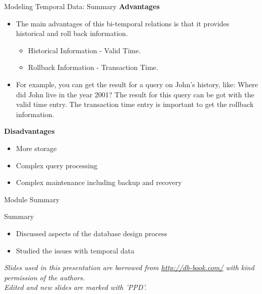 \documentclass[aspectratio=169, xcolor=dvipsnames]{beamer}
\begin{document}
\begin{frame}{Modeling Temporal Data: Summary}
    \textbf{Advantages}
    \begin{itemize}[<+->]
        \item The main advantages of this bi-temporal relations is that it provides historical and roll back information.
        \begin{itemize}
            \item[$\triangleright$] Historical Information - Valid Time.
            \item[$\triangleright$] Rollback Information - Transaction Time.
        \end{itemize}
        \item For example, you can get the result for a query on John's history, like: Where did John live in the year 2001? The result for this query can be got with the valid time entry. The transaction time entry is important to get the rollback information.
    \end{itemize}
    \vspace{0.5em}
    \textbf{Disadvantages}
    \begin{itemize}[<+->]
        \item More storage
        \item Complex query processing
        \item Complex maintenance including backup and recovery
    \end{itemize}
\end{frame}

\begin{frame}{Module Summary}
    \begin{block}{Summary}
        \begin{itemize}[<+->]
            \item Discussed aspects of the database design process
            \item Studied the issues with temporal data
        \end{itemize}
    \end{block}
    \vspace{2em}
    \begin{center}
    \small \textit{Slides used in this presentation are borrowed from \url{http://db-book.com/} with kind permission of the authors.} \\
    \small \textit{Edited and new slides are marked with 'PPD'.}
    \end{center}
\end{frame}
\end{document}
